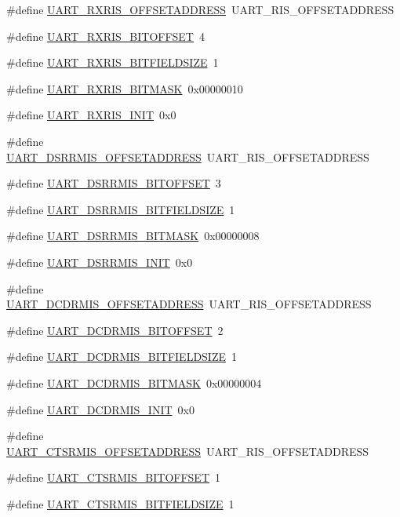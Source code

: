 \begin{DoxyCompactItemize}
\item 
\#define \hyperlink{a00575_a03969ba97c78326b0d9ad5dd2f28e0b1}{UART\_\-RXRIS\_\-OFFSETADDRESS}~UART\_\-RIS\_\-OFFSETADDRESS
\item 
\#define \hyperlink{a00575_a6e324bf27b6e09af3e01039cebdc1ee6}{UART\_\-RXRIS\_\-BITOFFSET}~4
\item 
\#define \hyperlink{a00575_aa84c8a3337983015bf99bb4b2886fb75}{UART\_\-RXRIS\_\-BITFIELDSIZE}~1
\item 
\#define \hyperlink{a00575_a95d4209d9f0ebce6ed31bb26a8f3b3ce}{UART\_\-RXRIS\_\-BITMASK}~0x00000010
\item 
\#define \hyperlink{a00575_a1079c71e5c92463935f85d8583dcf261}{UART\_\-RXRIS\_\-INIT}~0x0
\item 
\#define \hyperlink{a00575_a7d1499d4a3152c2b3a2f48c465a936fa}{UART\_\-DSRRMIS\_\-OFFSETADDRESS}~UART\_\-RIS\_\-OFFSETADDRESS
\item 
\#define \hyperlink{a00575_af13f92ff2d29e54d008bed578047ea72}{UART\_\-DSRRMIS\_\-BITOFFSET}~3
\item 
\#define \hyperlink{a00575_a189bd417c4629606724e0cba0d42f15d}{UART\_\-DSRRMIS\_\-BITFIELDSIZE}~1
\item 
\#define \hyperlink{a00575_a8b3405057359d55ebd45b5d5731c8bcd}{UART\_\-DSRRMIS\_\-BITMASK}~0x00000008
\item 
\#define \hyperlink{a00575_a9bc811fe9a0ddb9a5ef909043fd1d056}{UART\_\-DSRRMIS\_\-INIT}~0x0
\item 
\#define \hyperlink{a00575_a0e75df8108c9595e72b2183da87c2766}{UART\_\-DCDRMIS\_\-OFFSETADDRESS}~UART\_\-RIS\_\-OFFSETADDRESS
\item 
\#define \hyperlink{a00575_a69b5d7d84087fed943513bd5c90c6bbb}{UART\_\-DCDRMIS\_\-BITOFFSET}~2
\item 
\#define \hyperlink{a00575_a85c0d487d399db3634809c28b5e144bc}{UART\_\-DCDRMIS\_\-BITFIELDSIZE}~1
\item 
\#define \hyperlink{a00575_a0615e6af15e997406fe3702a13c99d19}{UART\_\-DCDRMIS\_\-BITMASK}~0x00000004
\item 
\#define \hyperlink{a00575_af637fd422233478ddabc97fe9f9248c0}{UART\_\-DCDRMIS\_\-INIT}~0x0
\item 
\#define \hyperlink{a00575_a6d0473288b62692d9760b4379e4f886b}{UART\_\-CTSRMIS\_\-OFFSETADDRESS}~UART\_\-RIS\_\-OFFSETADDRESS
\item 
\#define \hyperlink{a00575_a5d5a524e4c4df9d3129547563fbd492f}{UART\_\-CTSRMIS\_\-BITOFFSET}~1
\item 
\#define \hyperlink{a00575_a043dc23620964dd7c012cbe9d1f9c19a}{UART\_\-CTSRMIS\_\-BITFIELDSIZE}~1

\end{DoxyCompactItemize}

